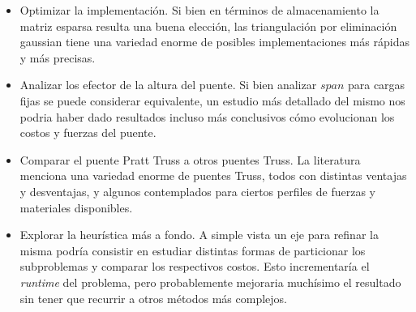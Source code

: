 \begin{itemize}
\item Optimizar la implementación. Si bien en términos de almacenamiento la matriz esparsa resulta una buena elección, las triangulación por eliminación gaussian tiene una variedad enorme de posibles implementaciones más rápidas y más precisas.
\item Analizar los efector de la altura del puente. Si bien analizar $span$ para cargas fijas se puede considerar equivalente, un estudio más detallado del mismo nos podria haber dado resultados incluso más conclusivos cómo evolucionan los costos y fuerzas del puente.
\item Comparar el puente Pratt Truss a otros puentes Truss. La literatura menciona una variedad enorme de puentes Truss, todos con distintas ventajas y desventajas, y algunos contemplados para ciertos perfiles de fuerzas y materiales disponibles.
\item Explorar la heurística más a fondo. A simple vista un eje para refinar la misma podría consistir en estudiar distintas formas de particionar los subproblemas y comparar los respectivos costos. Esto incrementaría el \textit{runtime} del problema, pero probablemente mejoraria muchísimo el resultado sin tener que recurrir a otros métodos más complejos.
\end{itemize}
